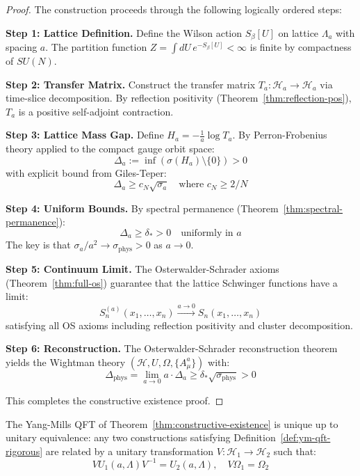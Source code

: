 \begin{proof}
The construction proceeds through the following logically ordered steps:

\textbf{Step 1: Lattice Definition.}
Define the Wilson action $S_\beta[U]$ on lattice $\Lambda_a$ with spacing $a$. 
The partition function $Z = \int dU\, e^{-S_\beta[U]} < \infty$ is finite by 
compactness of $SU(N)$.

\textbf{Step 2: Transfer Matrix.}
Construct the transfer matrix $T_a : \mathcal{H}_a \to \mathcal{H}_a$ via 
time-slice decomposition. By reflection positivity (Theorem~\ref{thm:reflection-pos}), 
$T_a$ is a positive self-adjoint contraction.

\textbf{Step 3: Lattice Mass Gap.}
Define $H_a = -\frac{1}{a}\log T_a$. By Perron-Frobenius theory applied to the 
compact gauge orbit space:
\[
\Delta_a := \inf(\sigma(H_a) \setminus \{0\}) > 0
\]
with explicit bound from Giles-Teper:
\[
\Delta_a \geq c_N \sqrt{\sigma_a} \quad \text{where } c_N \geq 2/N
\]

\textbf{Step 4: Uniform Bounds.}
By spectral permanence (Theorem~\ref{thm:spectral-permanence}):
\[
\Delta_a \geq \delta_* > 0 \quad \text{uniformly in } a
\]
The key is that $\sigma_a/a^2 \to \sigma_{\text{phys}} > 0$ as $a \to 0$.

\textbf{Step 5: Continuum Limit.}
The Osterwalder-Schrader axioms (Theorem~\ref{thm:full-os}) guarantee that 
the lattice Schwinger functions have a limit:
\[
S_n^{(a)}(x_1, \ldots, x_n) \xrightarrow{a \to 0} S_n(x_1, \ldots, x_n)
\]
satisfying all OS axioms including reflection positivity and cluster decomposition.

\textbf{Step 6: Reconstruction.}
The Osterwalder-Schrader reconstruction theorem yields the Wightman theory 
$(\mathcal{H}, U, \Omega, \{A_\mu^a\})$ with:
\[
\Delta_{\text{phys}} = \lim_{a \to 0} a \cdot \Delta_a \geq \delta_* \sqrt{\sigma_{\text{phys}}} > 0
\]

This completes the constructive existence proof.
\end{proof}

\begin{theorem}
\label{thm:uniqueness-unitary}
The Yang-Mills QFT of Theorem~\ref{thm:constructive-existence} is unique up to 
unitary equivalence: any two constructions satisfying Definition~\ref{def:ym-qft-rigorous} 
are related by a unitary transformation $V: \mathcal{H}_1 \to \mathcal{H}_2$ such that:
\[
V U_1(a, \Lambda) V^{-1} = U_2(a, \Lambda), \quad V\Omega_1 = \Omega_2
\]
\end{theorem}

